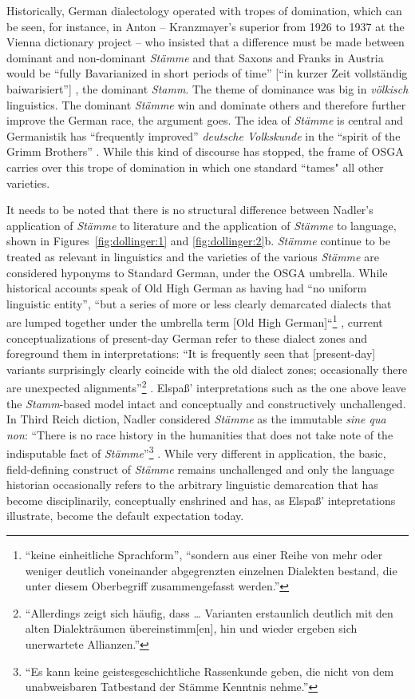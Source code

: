 \documentclass[output=paper]{langscibook}
\begin{document}
Historically, German dialectology operated with tropes of domination, which can be seen, for instance, in Anton \citet[58]{Pfalz1927} – Kranzmayer’s superior from 1926 to 1937 at the Vienna dictionary project – who insisted that a difference must be made between dominant and non-dominant \textit{Stämme} and that Saxons and Franks in Austria would be “fully Bavarianized in short periods of time” [“in kurzer Zeit vollständig baiwarisiert”] \citep[60--61]{Pfalz1927}, the dominant \textit{Stamm}. The theme of dominance was big in \textit{völkisch} linguistics. The dominant \textit{Stämme} win and dominate others and therefore further improve the German race, the argument goes. The idea of \textit{Stämme} is central and Germanistik has “frequently improved” \textit{deutsche Volkskunde} in the “spirit of the Grimm Brothers” \citep[62]{Pfalz1927}. While this kind of discourse has stopped, the frame of OSGA carries over this trope of domination in which one standard ``tames" all other varieties.

It needs to be noted that there is no structural difference between Nadler’s application of \textit{Stämme} to literature and the application of \textit{Stämme} to language, shown in Figures~\ref{fig:dollinger:1} and \ref{fig:dollinger:2}b. \textit{Stämme} continue to be treated as relevant in linguistics and the varieties of the various \textit{Stämme} are considered hyponyms to Standard German, under the OSGA umbrella. While historical accounts speak of Old High German as having had “no uniform linguistic entity”, “but a series of more or less clearly demarcated dialects that are lumped together under the umbrella term [Old High German]“\footnote{{}``keine einheitliche Sprachform'', ``sondern aus einer Reihe von mehr oder weniger deutlich voneinander abgegrenzten einzelnen Dialekten bestand, die unter diesem Oberbegriff zusammengefasst werden.''} \citep[76]{Ernst2021}, current conceptualizations of present-day German refer to these dialect zones and foreground them in interpretations: “It is frequently seen that [present-day] variants surprisingly clearly coincide with the old dialect zones; occasionally there are unexpected alignments”\footnote{{}``Allerdings zeigt sich häufig, dass … Varianten erstaunlich deutlich mit den alten Dialekträumen übereinstimm[en], hin und wieder ergeben sich unerwartete Allianzen.''} \citep[73]{ElspaßEtAl2017}. Elspaß' interpretations such as the one above leave the \textit{Stamm}-based model intact and conceptually and constructively unchallenged. In Third Reich diction, Nadler considered \textit{Stämme} as the immutable \textit{sine qua non}: “There is no race history in the humanities that does not take note of the indisputable fact of \textit{Stämme}”\footnote{{}``Es kann keine geistesgeschichtliche Rassenkunde geben, die nicht von dem unabweisbaren Tatbestand der Stämme Kenntnis nehme.''} \citep[18]{Nadler1934}. While very different in application, the basic, field-defining construct of \textit{Stämme} remains unchallenged and only the language historian occasionally refers to the arbitrary linguistic demarcation that has become disciplinarily, conceptually enshrined and has, as Elspaß’ intepretations illustrate, become the default expectation today.
\end{document}
